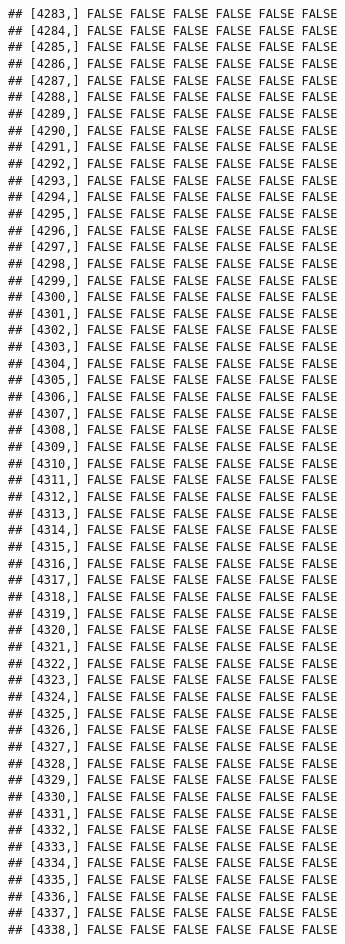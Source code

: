 \documentclass[
]{article}
\begin{document}
\begin{verbatim}
## [4283,] FALSE FALSE FALSE FALSE FALSE FALSE
## [4284,] FALSE FALSE FALSE FALSE FALSE FALSE
## [4285,] FALSE FALSE FALSE FALSE FALSE FALSE
## [4286,] FALSE FALSE FALSE FALSE FALSE FALSE
## [4287,] FALSE FALSE FALSE FALSE FALSE FALSE
## [4288,] FALSE FALSE FALSE FALSE FALSE FALSE
## [4289,] FALSE FALSE FALSE FALSE FALSE FALSE
## [4290,] FALSE FALSE FALSE FALSE FALSE FALSE
## [4291,] FALSE FALSE FALSE FALSE FALSE FALSE
## [4292,] FALSE FALSE FALSE FALSE FALSE FALSE
## [4293,] FALSE FALSE FALSE FALSE FALSE FALSE
## [4294,] FALSE FALSE FALSE FALSE FALSE FALSE
## [4295,] FALSE FALSE FALSE FALSE FALSE FALSE
## [4296,] FALSE FALSE FALSE FALSE FALSE FALSE
## [4297,] FALSE FALSE FALSE FALSE FALSE FALSE
## [4298,] FALSE FALSE FALSE FALSE FALSE FALSE
## [4299,] FALSE FALSE FALSE FALSE FALSE FALSE
## [4300,] FALSE FALSE FALSE FALSE FALSE FALSE
## [4301,] FALSE FALSE FALSE FALSE FALSE FALSE
## [4302,] FALSE FALSE FALSE FALSE FALSE FALSE
## [4303,] FALSE FALSE FALSE FALSE FALSE FALSE
## [4304,] FALSE FALSE FALSE FALSE FALSE FALSE
## [4305,] FALSE FALSE FALSE FALSE FALSE FALSE
## [4306,] FALSE FALSE FALSE FALSE FALSE FALSE
## [4307,] FALSE FALSE FALSE FALSE FALSE FALSE
## [4308,] FALSE FALSE FALSE FALSE FALSE FALSE
## [4309,] FALSE FALSE FALSE FALSE FALSE FALSE
## [4310,] FALSE FALSE FALSE FALSE FALSE FALSE
## [4311,] FALSE FALSE FALSE FALSE FALSE FALSE
## [4312,] FALSE FALSE FALSE FALSE FALSE FALSE
## [4313,] FALSE FALSE FALSE FALSE FALSE FALSE
## [4314,] FALSE FALSE FALSE FALSE FALSE FALSE
## [4315,] FALSE FALSE FALSE FALSE FALSE FALSE
## [4316,] FALSE FALSE FALSE FALSE FALSE FALSE
## [4317,] FALSE FALSE FALSE FALSE FALSE FALSE
## [4318,] FALSE FALSE FALSE FALSE FALSE FALSE
## [4319,] FALSE FALSE FALSE FALSE FALSE FALSE
## [4320,] FALSE FALSE FALSE FALSE FALSE FALSE
## [4321,] FALSE FALSE FALSE FALSE FALSE FALSE
## [4322,] FALSE FALSE FALSE FALSE FALSE FALSE
## [4323,] FALSE FALSE FALSE FALSE FALSE FALSE
## [4324,] FALSE FALSE FALSE FALSE FALSE FALSE
## [4325,] FALSE FALSE FALSE FALSE FALSE FALSE
## [4326,] FALSE FALSE FALSE FALSE FALSE FALSE
## [4327,] FALSE FALSE FALSE FALSE FALSE FALSE
## [4328,] FALSE FALSE FALSE FALSE FALSE FALSE
## [4329,] FALSE FALSE FALSE FALSE FALSE FALSE
## [4330,] FALSE FALSE FALSE FALSE FALSE FALSE
## [4331,] FALSE FALSE FALSE FALSE FALSE FALSE
## [4332,] FALSE FALSE FALSE FALSE FALSE FALSE
## [4333,] FALSE FALSE FALSE FALSE FALSE FALSE
## [4334,] FALSE FALSE FALSE FALSE FALSE FALSE
## [4335,] FALSE FALSE FALSE FALSE FALSE FALSE
## [4336,] FALSE FALSE FALSE FALSE FALSE FALSE
## [4337,] FALSE FALSE FALSE FALSE FALSE FALSE
## [4338,] FALSE FALSE FALSE FALSE FALSE FALSE

\end{verbatim}
\end{document}
